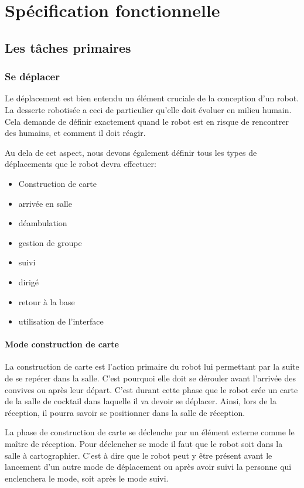 \chapter{Spécification fonctionnelle}

\section{Les tâches primaires}

\subsection{Se déplacer}

Le déplacement est bien entendu un élément cruciale de la conception
d'un robot. La desserte robotisée a ceci de particulier qu'elle doit
évoluer en milieu humain. Cela demande de définir exactement quand le
robot est en risque de rencontrer des humains, et comment il doit
réagir.

Au dela de cet aspect, nous devons également définir tous les types de
déplacements que le robot devra effectuer:

\begin{itemize}
\item Construction de carte
\item arrivée en salle
\item déambulation
\item gestion de groupe
\item suivi
\item dirigé
\item retour à la base
\item utilisation de l'interface
\end{itemize}

\subsubsection{Mode construction de carte}
La construction de carte est l'action primaire du robot lui permettant par la suite de se repérer dans la salle. C'est pourquoi elle doit se dérouler avant l'arrivée des convives ou après leur départ. C'est durant cette phase que le robot crée un carte de la salle de cocktail dans laquelle il va devoir se déplacer. Ainsi, lors de la réception, il pourra savoir se positionner dans la salle de réception.

La phase de construction de carte se déclenche par un élément externe comme le maître de réception. Pour déclencher se mode il faut que le robot soit dans la salle à cartographier. C'est à dire que le robot peut y être présent avant le lancement d'un autre mode de déplacement ou après avoir suivi la personne qui enclenchera le mode, soit après le mode suivi.

